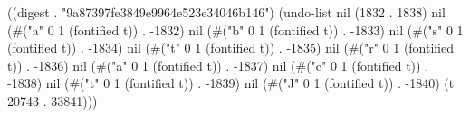 
((digest . "9a87397fe3849e9964e523e34046b146") (undo-list nil (1832 . 1838) nil (#("a" 0 1 (fontified t)) . -1832) nil (#("b" 0 1 (fontified t)) . -1833) nil (#("s" 0 1 (fontified t)) . -1834) nil (#("t" 0 1 (fontified t)) . -1835) nil (#("r" 0 1 (fontified t)) . -1836) nil (#("a" 0 1 (fontified t)) . -1837) nil (#("c" 0 1 (fontified t)) . -1838) nil (#("t" 0 1 (fontified t)) . -1839) nil (#("J" 0 1 (fontified t)) . -1840) (t 20743 . 33841)))
